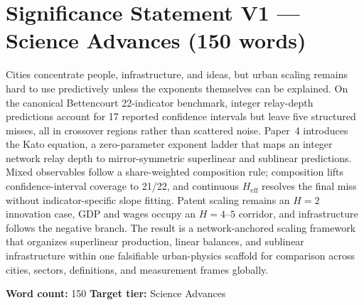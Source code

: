\documentclass[11pt]{article}
\begin{document}
\section*{Significance Statement V1 --- Science Advances (150 words)}

Cities concentrate people, infrastructure, and ideas, but urban scaling remains hard to use predictively unless the exponents themselves can be explained. On the canonical Bettencourt 22-indicator benchmark, integer relay-depth predictions account for 17 reported confidence intervals but leave five structured misses, all in crossover regions rather than scattered noise. Paper~4 introduces the Kato equation, a zero-parameter exponent ladder that maps an integer network relay depth to mirror-symmetric superlinear and sublinear predictions. Mixed observables follow a share-weighted composition rule; composition lifts confidence-interval coverage to 21/22, and continuous \(H_{\mathrm{eff}}\) resolves the final miss without indicator-specific slope fitting. Patent scaling remains an \(H=2\) innovation case, GDP and wages occupy an \(H=4\)--\(5\) corridor, and infrastructure follows the negative branch. The result is a network-anchored scaling framework that organizes superlinear production, linear balances, and sublinear infrastructure within one falsifiable urban-physics scaffold for comparison across cities, sectors, definitions, and measurement frames globally.

\vspace{1em}
\noindent\textbf{Word count:} 150 \hfill \textbf{Target tier:} Science Advances
\end{document}
